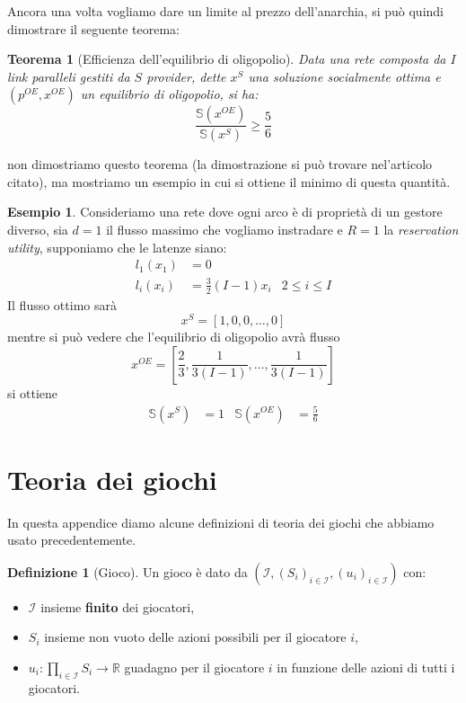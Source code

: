 \documentclass[a4paper]{article}
\newcounter{counter1}
\theoremstyle{plain}
\newtheorem{myteo}[counter1]{Teorema}
\theoremstyle{definition}
\newtheorem{mydef}[counter1]{Definizione}
\newtheorem{myes}[counter1]{Esempio}
\theoremstyle{remark}
\newcommand{\pa}[1]{\left(#1\right)}
\newcommand{\bra}[1]{\left[#1\right]}
\begin{document}
Ancora una volta vogliamo dare un limite al prezzo dell'anarchia, si
può quindi dimostrare il seguente teorema:

\begin{myteo}[Efficienza dell'equilibrio di
  oligopolio{\cite[Teorema 5.2]{acemoglu2007-2}}]
  Data una rete composta da $I$ link paralleli gestiti da $S$
  provider, dette $x^{S}$ una soluzione socialmente ottima e
  $\pa{p^{OE},x^{OE}}$ un equilibrio di oligopolio, si ha:
  \[ \frac{\mathbb{S}\pa{x^{OE}}} {\mathbb{S}\pa{x^S}} \ge
    \frac{5}{6} \]
\end{myteo}
non dimostriamo questo teorema (la dimostrazione si può trovare
nel'articolo citato), ma mostriamo un esempio in cui si ottiene il
minimo di questa quantità.

\begin{myes}
  Consideriamo una rete dove ogni arco è di proprietà di un gestore
  diverso, sia $d=1$ il flusso massimo che vogliamo instradare e $R=1$
  la \textit{reservation utility}, supponiamo che le latenze siano:
  \begin{align*}
    l_1(x_1) &= 0 \\
    l_i(x_i) &= \frac{3}{2}(I-1)x_i & 2 \le i \le I
  \end{align*}
  Il flusso ottimo sarà
  \[ x^S = \bra{1,0,0,\dots, 0} \]
  mentre si può vedere che l'equilibrio di oligopolio avrà flusso
  \[ x^{OE} = \bra{ \frac{2}{3}, \frac{1}{3(I-1)}, \dots ,
      \frac{1}{3(I-1)}} \]
  si ottiene
  \begin{align*}
    \mathbb{S}\pa{x^S} & = 1 & \mathbb{S}\pa{x^{OE}} & = \frac{5}{6}
  \end{align*}
\end{myes}


\appendix

\section{Teoria dei giochi}
\label{sec:teoria-giochi}

In questa appendice diamo alcune definizioni di teoria dei giochi che
abbiamo usato precedentemente.

\begin{mydef}[Gioco]%
  Un gioco è dato da $\pa{\mathcal{I},\pa{S_i}_{i\in\mathcal{I}},
    \pa{u_i}_{i\in\mathcal{I}}}$ con:
  \begin{itemize}
  \item $\mathcal{I}$ insieme \textbf{finito} dei giocatori,
  \item $S_i$ insieme non vuoto delle azioni possibili per il
    giocatore $i$,
  \item $u_i: \prod _{i\in\mathcal{I}} S_i \to \mathbb{R}$ guadagno
    per il giocatore $i$ in funzione delle azioni di tutti i
    giocatori.
  \end{itemize}
\end{mydef}
\end{document}

